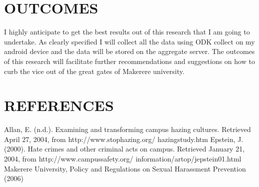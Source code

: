 \documentclass[10pt]{article}
\begin{document}
\section{OUTCOMES}
{I highly anticipate to get the best results out of this research that I am going to undertake. As clearly specified I will collect all the data using ODK collect on my android device and the data will be stored on the aggregate server. The outcomes of this research will facilitate further recommendations and suggestions on how to curb the vice out of the great gates of Makerere university.
}
\section{REFERENCES}
{Allan, E. (n.d.). Examining and transforming
	campus hazing cultures. Retrieved April 27,
	2004, from http://www.stophazing.org/
	hazingstudy.htm
Epstein, J. (2000). Hate crimes and other criminal
acts on campus. Retrieved January 21, 2004,
from http://www.campussafety.org/
information/artop/jepstein01.html
Makerere University, Policy and Regulations on Sexual Harassment Prevention (2006)}
\end{document}
